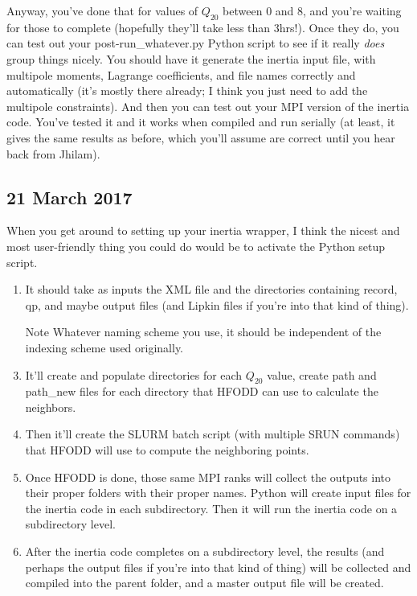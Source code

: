 \documentclass[]{report}
\begin{document}
Anyway, you've done that for values of $Q_{20}$ between 0 and 8, and you're waiting for those to complete (hopefully they'll take less than 3hrs!). Once they do, you can test out your post-run\_whatever.py Python script to see if it really \textit{does} group things nicely. You should have it generate the inertia input file, with multipole moments, Lagrange coefficients, and file names correctly and automatically (it's mostly there already; I think you just need to add the multipole constraints). And then you can test out your MPI version of the inertia code. You've tested it and it works when compiled and run serially (at least, it gives the same results as before, which you'll assume are correct until you hear back from Jhilam).

\subsection*{21 March 2017}
When you get around to setting up your inertia wrapper, I think the nicest and most user-friendly thing you could do would be to activate the Python setup script.

\begin{enumerate}
\item It should take as inputs the XML file and the directories containing record, qp, and maybe output files (and Lipkin files if you're into that kind of thing).
\item[Note] Whatever naming scheme you use, it should be independent of the indexing scheme used originally.
\item It'll create and populate directories for each $Q_{20}$ value, create path and path\_new files for each directory that HFODD can use to calculate the neighbors.
\item Then it'll create the SLURM batch script (with multiple SRUN commands) that HFODD will use to compute the neighboring points.
\item Once HFODD is done, those same MPI ranks will collect the outputs into their proper folders with their proper names. Python will create input files for the inertia code in each subdirectory. Then it will run the inertia code on a subdirectory level.
\item After the inertia code completes on a subdirectory level, the results (and perhaps the output files if you're into that kind of thing) will be collected and compiled into the parent folder, and a master output file will be created.
\end{enumerate}  
\end{document}
